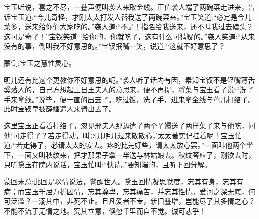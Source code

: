 \begin{parag}
    宝玉听说，喜之不尽，一叠声便叫袭人来取金线。正值袭人端了两碗菜走进来，告诉宝玉道:“今儿奇怪，才刚太太打发人替我送了两碗菜来。”宝玉笑道:“必定是今儿菜多，送来给你们大家吃的。”袭人道:“不是！指名给我送来，还不叫我过去磕头？这可是奇了！”宝钗笑道:“给你的，你就吃了，这有什么可猜疑的。”袭人笑道:“从来没有的事，倒叫我不好意思的。”宝钗抿嘴一笑，说道:“这就不好意思了？\begin{note}蒙侧:宝玉之慧性灵心。\end{note}明儿还有比这个更教你不好意思的呢。”袭人听了话内有因，素知宝钗不是轻嘴薄舌奚落人的，自己方想起上日王夫人的意思来，便不再提，将菜与宝玉看了说:“洗了手来拿线。”说毕，便一直的出去了。吃过饭，洗了手，进来拿金线与莺儿打络子。此时宝钗早被薛蟠遣人来请出去了。
\end{parag}


\begin{parag}
    这里宝玉正看着打络子，忽见邢夫人那边遣了两个丫嬛送了两样菓子来与他吃，问他‘可走得了？若走得动，叫哥儿明儿过来散散心，’太太著实记挂着呢！宝玉忙道:“若走得了，必请太太的安去。疼的比先好些，请太太放心罢。”一面叫他两个坐下，一面又叫秋纹来，把才那果子拿一半送与林姑娘去。秋纹答应了，刚欲去时，只听黛玉在院内说话，宝玉忙叫:“快请。”要知端的，且听下回分解。
\end{parag}


\begin{parag}
    \begin{note}蒙回末总:此回是以情说法，警醒世人。黛玉回情凝思默度，忘其有身，忘其有病；而宝玉千屈万折因情，忘其尊卑，忘其痛苦，幷忘其性情。爱河之深无底，何可泛滥？一溺其中，非死不止。且凡爱者不专，新旧叠增，岂能尽了其多情之心？不能不流于无情之地。究其立意，倏忽千里而自不觉。诚可悲乎！\end{note}
\end{parag}

